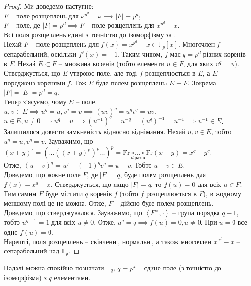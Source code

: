 \documentclass{math_library}
\begin{document}
\begin{proof}
Ми доведемо наступне:\\
$F$ -- поле розщеплень для $x^{p^d} - x \implies |F| = p^d$;\\
$F$ -- поле, де $|F| = p^d \implies F$ -- поле розщеплень для $x^{p^d} - x$.\\
Всі поля розщеплень єдині з точністю до ізоморфізму за .\\
Нехай $F$ -- поле розщеплень для $f(x) = x^{p^d} - x \in \mathbb{F}_p[x]$. Многочлен $f$ -- сепарабельний, оскільки $f'(x) = -1$. Таким чином, $f$ має $q = p^d$ різних коренів в $F$. Нехай $E \subset F$ -- множина коренів (тобто елементи $u \in F$, для яких $u^q = u$). Стверджується, що $E$ утвроює поле, але тоді $f$  розщеплюється в $E$, а $E$ породжена коренями $f$. Тож $E$ буде полем розщеплень: $E = F$. Зокрема $|F| = |E| = p^d = q$.\\
Тепер з'ясуємо, чому $E$ -- поле.\\
$u,v \in E \implies u^q = u, v^q = v \implies (uv)^q = u^q v^q = uv$.\\
$u \in E, u \neq 0 \implies u^q = u \implies (u^{-1})^q = u^{-q} = (u^q)^{-1} = u^{-1} \implies u^{-1} \in E$.\\
Залишилося довести замкненість відносно віднімання. Нехай $u,v \in E$, тобто $u^q = u, v^q = v$. Зауважимо, що $(x+y)^q = ( \dots ((x+y)^p)^p \dots )^p = \underset{d \text{ разів}}{\text{Fr} \circ \dots \circ \text{Fr}}(x+y) = x^q + y^q$.\\
Отже, $(u-v)^q = u^q + (-1)^q v^q = u-v$. Тобто $u-v \in E$.
\bigskip \\
Доведемо, що кожне поле $F$, де $|F| = q$, буде полем розщеплень для $f(x) = x^q - x$. Стверджується, що якщо $|F| = q$, то $f(u) = 0$ для всіх $u \in F$. Тим самим $F$ буде містити $q$ коренів $f$ (тобто $f$ розщеплюється в $F$), в жодному меншому полі це не можна. Отже, $F$ -- дійсно буде полем розщеплень.\\
Доведемо, що стверджувалося. Зауважимо, що $\left<F^\times, \cdot \right>$ -- група порядка $q-1$, тобто $u^{q-1} = 1$ для всіх $u \neq 0$. Отже, $u^q = q \implies f(u) = 0, u \neq 0$. При $u = 0$ все одно $f(u) = 0$.\\
Нарешті, поля розщеплень -- скінченні, нормальні, а також многочлен $x^{p^d} - x$ -- сепарабельний над $\mathbb{F}_p$.
\end{proof}

Надалі можна спокійно позначати $\mathbb{F}_q,\ q = p^d$ -- єдине поле (з точністю до ізоморфізма) з $q$ елементами.
\end{document}
